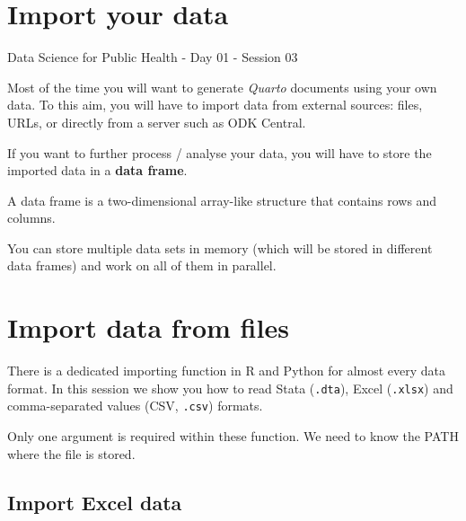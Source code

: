 \documentclass[
  letterpaper,
  DIV=11,
  numbers=noendperiod]{scrreprt}
\begin{document}

\hypertarget{import-your-data}{%
\chapter{Import your data}\label{import-your-data}}

Data Science for Public Health - Day 01 - Session 03

\hfill\break

Most of the time you will want to generate \emph{Quarto} documents using
your own data. To this aim, you will have to import data from external
sources: files, URLs, or directly from a server such as ODK Central.

If you want to further process / analyse your data, you will have to
store the imported data in a \textbf{data frame}.

\begin{tcolorbox}[enhanced jigsaw, left=2mm, colback=white, coltitle=black, toptitle=1mm, bottomrule=.15mm, rightrule=.15mm, leftrule=.75mm, bottomtitle=1mm, colbacktitle=quarto-callout-note-color!10!white, opacityback=0, arc=.35mm, colframe=quarto-callout-note-color-frame, titlerule=0mm, title=\textcolor{quarto-callout-note-color}{\faInfo}\hspace{0.5em}{Note}, breakable, toprule=.15mm, opacitybacktitle=0.6]
A data frame is a two-dimensional array-like structure that contains
rows and columns.
\end{tcolorbox}

You can store multiple data sets in memory (which will be stored in
different data frames) and work on all of them in parallel.


\hypertarget{import-data-from-files}{%
\chapter{Import data from files}\label{import-data-from-files}}

There is a dedicated importing function in R and Python for almost every
data format. In this session we show you how to read Stata
(\texttt{.dta}), Excel (\texttt{.xlsx}) and comma-separated values (CSV,
\texttt{.csv}) formats.

Only one argument is required within these function. We need to know the
PATH where the file is stored.

\hypertarget{import-excel-data}{%
\section{Import Excel data}\label{import-excel-data}}
\end{document}
